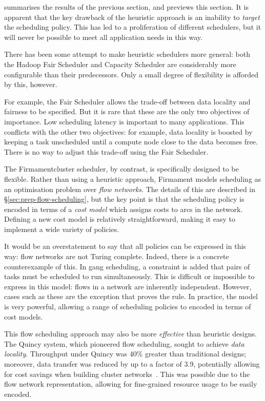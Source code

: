  summarises the results of the previous section, and previews this section. It is apparent that the key drawback of the heuristic approach is an inability to \emph{target} the scheduling policy. This has led to a proliferation of different schedulers, but it will never be possible to meet all application needs in this way.

There has been some attempt to make heuristic schedulers more general: both the Hadoop Fair Scheduler and Capacity Scheduler are considerably more configurable than their predecessors. Only a small degree of flexibility is afforded by this, however. 

For example, the Fair Scheduler allows the trade-off between data locality and fairness to be specified. But it is rare that these are the only two objectives of importance. Low scheduling latency is important to many applications. This conflicts with the other two objectives: for example, data locality is boosted by keeping a task unscheduled until a compute node close to the data becomes free. There is no way to adjust this trade-off using the Fair Scheduler.

The Firmament\footnotemark cluster scheduler, by contrast, is specifically designed to be flexible. Rather than using a heuristic approach, Firmament models scheduling as an optimisation problem over \emph{flow networks}. The details of this are described in \S\ref{sec:prep-flow-scheduling}, but the key point is that the scheduling policy is encoded in terms of a \emph{cost model} which assigns costs to arcs in the network. Defining a new cost model is relatively straightforward, making it easy to implement a wide variety of policies.

It would be an overstatement to say that all policies can be expressed in this way: flow networks are not Turing complete. Indeed, there is a concrete counterexample of this. In gang scheduling, a constraint is added that pairs of tasks must be scheduled to run simultaneously. This is difficult or impossible to express in this model: flows in a network are inherently independent. However, cases such as these are the exception that proves the rule. In practice, the model is very powerful, allowing a range of scheduling policies to encoded in terms of cost models. 

This flow scheduling approach may also be more \emph{effective} than heuristic designs. The Quincy system, which pioneered flow scheduling, sought to achieve \emph{data locality}. Throughput under Quincy was 40\% greater than traditional designs; moreover, data transfer was reduced by up to a factor of 3.9, potentially allowing for cost savings when building cluster networks~\cite{Isard:2009}. This was possible due to the flow network representation, allowing for fine-grained resource usage to be easily encoded. 

